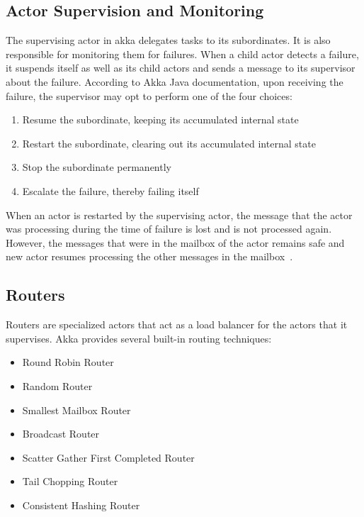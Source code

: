   \subsection{Actor Supervision and Monitoring}
  \label{subsec:supervisionMonitoring}
  The supervising actor in akka delegates tasks to its subordinates. It is also responsible for monitoring them for failures. When a child actor detects a failure, it suspends itself as well as its child actors and sends a message to its supervisor about the failure. According to Akka Java documentation\cite{akkaJavaDoc}, upon receiving the failure, the supervisor may opt to perform one of the four choices:
  \begin{enumerate}
    \item Resume the subordinate, keeping its accumulated internal state
    \item Restart the subordinate, clearing out its accumulated internal state
    \item Stop the subordinate permanently
    \item Escalate the failure, thereby failing itself
  \end{enumerate}

  When an actor is restarted by the supervising actor, the message that the actor was processing during the time of failure is lost and is not processed again. However, the messages that were in the mailbox of the actor remains safe and new actor resumes processing the other messages in the mailbox~\cite{akkaJavaDoc}.

  \subsection{Routers}
  Routers are specialized actors that act as a load balancer for the actors that it supervises. Akka provides several built-in routing techniques:~\cite{akkaJavaDoc}
  \begin{itemize}
    \item Round Robin Router
    \item Random Router
    \item Smallest Mailbox Router
    \item Broadcast Router
    \item Scatter Gather First Completed Router
    \item Tail Chopping Router
    \item Consistent Hashing Router
  \end{itemize}

